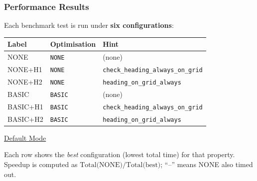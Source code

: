\subsubsection*{Performance Results}
Each benchmark test is run under \textbf{six configurations}:

\begin{center}
\begin{tabular}{lll}
\toprule
\textbf{Label} & \textbf{Optimisation} & \textbf{Hint} \\
\midrule
NONE     & \texttt{NONE}  & (none) \\
NONE+H1  & \texttt{NONE}  & \texttt{check\_heading\_always\_on\_grid} \\
NONE+H2  & \texttt{NONE}  & \texttt{heading\_on\_grid\_always} \\
BASIC    & \texttt{BASIC} & (none) \\
BASIC+H1 & \texttt{BASIC} & \texttt{check\_heading\_always\_on\_grid} \\
BASIC+H2 & \texttt{BASIC} & \texttt{heading\_on\_grid\_always} \\
\bottomrule
\end{tabular}
\end{center}

\underline{Default Mode}

Each row shows the \emph{best} configuration (lowest total time) for that property.
Speedup is computed as $\text{Total(NONE)} / \text{Total(best)}$; ``--'' means NONE also timed out.

